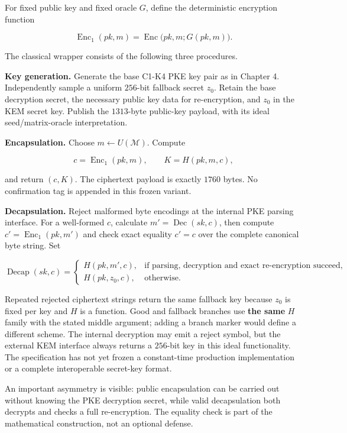 \documentclass[
  11pt,
  a4paper,
  oneside]{report}
\begin{document}
For fixed public key and fixed oracle \(G\), define the deterministic
encryption function

\[
\operatorname{Enc}_1(pk,m)
=\operatorname{Enc}\bigl(pk,m;G(pk,m)\bigr).
\]

The classical wrapper consists of the following three procedures.

\textbf{Key generation.} Generate the base C1-K4 PKE key pair as in
Chapter 4. Independently sample a uniform \(256\)-bit fallback secret
\(z_0\). Retain the base decryption secret, the necessary public key
data for re-encryption, and \(z_0\) in the KEM secret key. Publish the
\(1313\)-byte public-key payload, with its ideal seed/matrix-oracle
interpretation.

\textbf{Encapsulation.} Choose \(m\leftarrow U(\mathcal M)\). Compute

\[
c=\operatorname{Enc}_1(pk,m),\qquad K=H(pk,m,c),
\]

and return \((c,K)\). The ciphertext payload is exactly \(1760\) bytes.
No confirmation tag is appended in this frozen variant.

\textbf{Decapsulation.} Reject malformed byte encodings at the internal
PKE parsing interface. For a well-formed \(c\), calculate
\(m'=\operatorname{Dec}(sk,c)\), then compute
\(c'=\operatorname{Enc}_1(pk,m')\) and check exact equality \(c'=c\)
over the complete canonical byte string. Set

\[
\operatorname{Decap}(sk,c)=
\begin{cases}
H(pk,m',c),& \text{if parsing, decryption and exact re-encryption succeed},\\
H(pk,z_0,c),& \text{otherwise}.
\end{cases}
\]

Repeated rejected ciphertext strings return the same fallback key
because \(z_0\) is fixed per key and \(H\) is a function. Good and
fallback branches use \textbf{the same} \(H\) family with the stated
middle argument; adding a branch marker would define a different scheme.
The internal decryption may emit a reject symbol, but the external KEM
interface always returns a \(256\)-bit key in this ideal functionality.
The specification has not yet frozen a constant-time production
implementation or a complete interoperable secret-key format.

An important asymmetry is visible: public encapsulation can be carried
out without knowing the PKE decryption secret, while valid decapsulation
both decrypts and checks a full re-encryption. The equality check is
part of the mathematical construction, not an optional defense.
\end{document}
